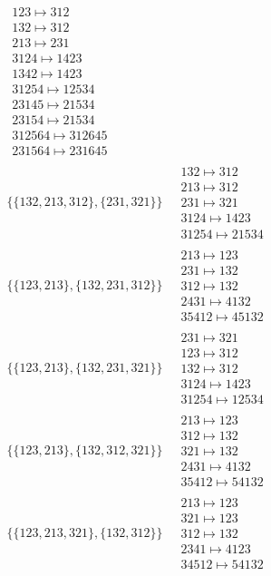 \begin{scriptsize}
\begin{align}
\begin{matrix}
123 \mapsto 312\\132 \mapsto 312\\213 \mapsto 231\\3124 \mapsto 1423\\1342 \mapsto 1423\\31254 \mapsto 12534\\23145 \mapsto 21534\\23154 \mapsto 21534\\312564 \mapsto 312645\\231564 \mapsto 231645
\end{matrix}
\\
\{\{132, 213, 312\}, \{231, 321\}\}
\ 
&
\begin{matrix}
132 \mapsto 312\\213 \mapsto 312\\231 \mapsto 321\\3124 \mapsto 1423\\31254 \mapsto 21534
\end{matrix}
\\
\{\{123, 213\}, \{132, 231, 312\}\}
\ 
&
\begin{matrix}
213 \mapsto 123\\231 \mapsto 132\\312 \mapsto 132\\2431 \mapsto 4132\\35412 \mapsto 45132
\end{matrix}
\\
\{\{123, 213\}, \{132, 231, 321\}\}
\ 
&
\begin{matrix}
231 \mapsto 321\\123 \mapsto 312\\132 \mapsto 312\\3124 \mapsto 1423\\31254 \mapsto 12534
\end{matrix}
\\
\{\{123, 213\}, \{132, 312, 321\}\}
\ 
&
\begin{matrix}
213 \mapsto 123\\312 \mapsto 132\\321 \mapsto 132\\2431 \mapsto 4132\\35412 \mapsto 54132
\end{matrix}
\\
\{\{123, 213, 321\}, \{132, 312\}\}
\ 
&
\begin{matrix}
213 \mapsto 123\\321 \mapsto 123\\312 \mapsto 132\\2341 \mapsto 4123\\34512 \mapsto 54132

\end{matrix}
\end{align}
\end{scriptsize}
